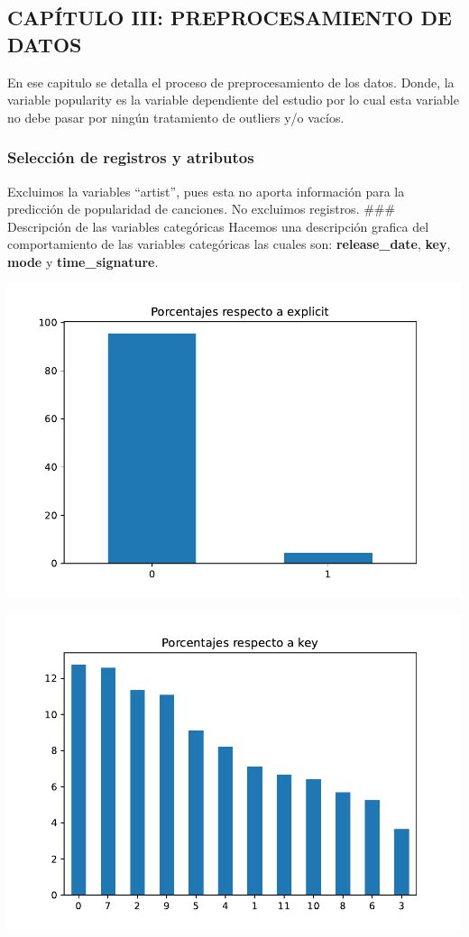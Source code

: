 \documentclass[
  letterpaper,
  DIV=11,
  numbers=noendperiod]{scrartcl}
\begin{document}
\hypertarget{capuxedtulo-iii-preprocesamiento-de-datos}{%
\subsection{CAPÍTULO III: PREPROCESAMIENTO DE
DATOS}\label{capuxedtulo-iii-preprocesamiento-de-datos}}

En ese capitulo se detalla el proceso de preprocesamiento de los datos.
Donde, la variable popularity es la variable dependiente del estudio por
lo cual esta variable no debe pasar por ningún tratamiento de outliers
y/o vacíos.

\hypertarget{selecciuxf3n-de-registros-y-atributos}{%
\subsubsection{Selección de registros y
atributos}\label{selecciuxf3n-de-registros-y-atributos}}

Excluimos la variables ``artist'', pues esta no aporta información para
la predicción de popularidad de canciones. No excluimos registros.
\#\#\# Descripción de las variables categóricas Hacemos una descripción
grafica del comportamiento de las variables categóricas las cuales son:
\textbf{release\_date}, \textbf{key}, \textbf{mode} y
\textbf{time\_signature}.

\includegraphics{informe_01_files/figure-pdf/unnamed-chunk-30-21.pdf}

\includegraphics{informe_01_files/figure-pdf/unnamed-chunk-30-22.pdf}
\end{document}
